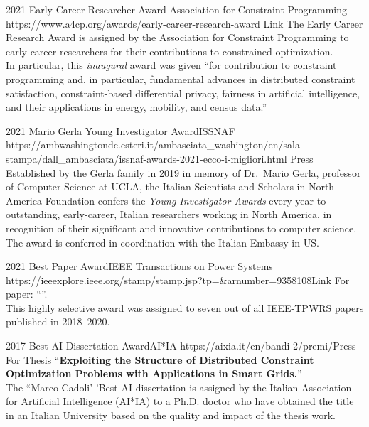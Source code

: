 \documentclass[localFont,alternative]{documentMETADATA}
\begin{document}
\begin{awards}
	\awardentryD
	{2021}
	{Early Career Researcher Award}
	{Association for Constraint Programming}
	{https://www.a4cp.org/awards/early-career-research-award}
	{Link}
	{The Early Career Research Award is assigned by the Association for Constraint Programming to early career researchers for their 
	contributions to constrained optimization.\\
	In particular, this \emph{inaugural} award was given 
	``for contribution to constraint programming and, in particular,
	fundamental advances in distributed constraint satisfaction, constraint-based
	differential privacy, fairness in artificial intelligence, and their 
	applications in energy, mobility, and census data.''}

	\awardentryD
	{2021}
	{Mario Gerla Young Investigator Award}{ISSNAF}
	{https://ambwashingtondc.esteri.it/ambasciata_washington/en/sala-stampa/dall_ambasciata/issnaf-awards-2021-ecco-i-migliori.html}
	{Press}
	{
	Established by the Gerla family in 2019 in memory of Dr.~Mario Gerla, professor of Computer Science at UCLA, the Italian Scientists and Scholars in North America Foundation confers the \emph{Young Investigator Awards} every year to outstanding, early-career, Italian researchers working in North America, in recognition of their significant and innovative contributions to computer science.
	The award is conferred in coordination with the Italian Embassy in US.
	}

	\awardentryD
	{2021}
	{Best Paper Award}{IEEE Transactions on Power Systems}
	{https://ieeexplore.ieee.org/stamp/stamp.jsp?tp=\&arnumber=9358108}{Link}
	{
	For paper: ``''.\\
	This highly selective award was assigned to seven out of all IEEE-TPWRS papers published in 2018--2020.}

	\awardentryD
	{2017}
	{Best AI Dissertation Award}{AI*IA} %
	{https://aixia.it/en/bandi-2/premi/}{Press}
	{For Thesis ``\textbf{Exploiting the Structure of Distributed Constraint Optimization Problems with Applications in Smart Grids.}''\\
	The ``Marco Cadoli' 'Best AI dissertation is assigned by the Italian 
	Association for Artificial Intelligence (AI*IA) to a Ph.D. doctor 
	who have obtained the title in an Italian University based on the 
	quality and impact of the thesis work.
	}
\end{awards}
\end{document}
